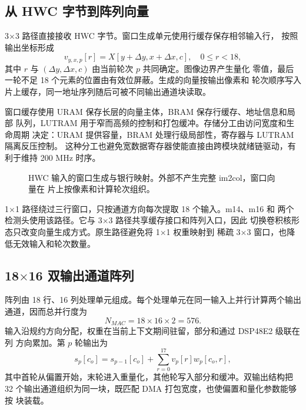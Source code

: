 \subsection{从 HWC 字节到阵列向量}

3$\times$3 路径直接接收 HWC 字节。窗口生成单元使用行缓存保存相邻输入行，
按照输出坐标形成
\begin{equation}
v_{y,x,p}[r]=X[y+\Delta y,x+\Delta x,c],\quad 0\le r<18,
\label{eq:window-vector}
\end{equation}
其中 $r$ 与 $(\Delta y,\Delta x,c)$ 由当前轮次 $p$ 共同确定。图像边界产生量化
零值，最后一轮不足 18 个元素的位置由有效位屏蔽。生成的向量按输出像素和
轮次顺序写入片上缓存，同一地址序列随后可被不同输出通道块读取。

窗口缓存使用 URAM 保存长层的向量主体，BRAM 保存行缓存、地址信息和局部
队列，LUTRAM 用于窄而高频的控制和打包缓冲。存储分工由访问宽度和生命周期
决定：URAM 提供容量，BRAM 处理行级局部性，寄存器与 LUTRAM 隔离反压控制。
这种分工也避免宽数据寄存器使能直接由跨模块就绪链驱动，有利于维持
200 MHz 时序。

\begin{figure}[t]
\centering
{}
\caption{HWC 输入的窗口生成与银行映射。外部不产生完整 im2col，窗口向量在
片上按像素和计算轮次组织。}
\label{fig:bank-placeholder}
\end{figure}

1$\times$1 路径绕过三行窗口，只按通道方向每次提取 18 个输入。m14、m16 和
两个检测头使用该路径。它与 3$\times$3 路径共享缓存接口和阵列入口，因此
切换卷积核形态只改变向量生成方式。原生路径避免将 1$\times$1 权重映射到
稀疏 3$\times$3 窗口，也降低无效输入和轮次数量。

\subsection{18$\times$16 双输出通道阵列}

阵列由 18 行、16 列处理单元组成。每个处理单元在同一输入上并行计算两个输出
通道，因而总并行度为
\begin{equation}
N_{MAC}=18\times16\times2=576.
\label{eq:mac-count}
\end{equation}
输入沿规约方向分配，权重在当前上下文期间驻留，部分和通过 DSP48E2 级联在列
方向累加\cite{dsp48e2}。第 $p$ 轮输出为
\begin{equation}
s_p[c_o]=s_{p-1}[c_o]+\sum_{r=0}^{17}v_p[r]w_p[c_o,r],
\label{eq:pass-sum}
\end{equation}
其中首轮从偏置开始，末轮进入重量化，其他轮写入部分和缓冲。双输出结构把
32 个输出通道组织为同一块，既匹配 DMA 打包宽度，也使偏置和量化参数能够按
块装载。


